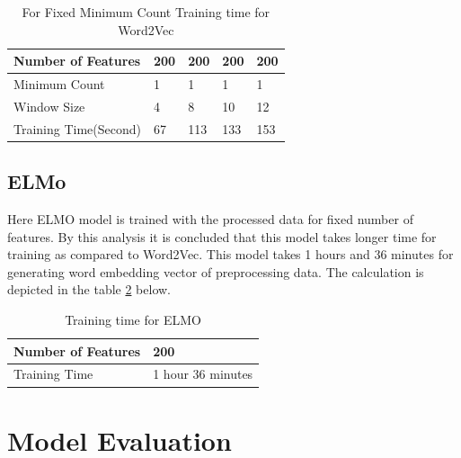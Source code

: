 \begin{center}
\begin{table}[H]
\caption{For Fixed Minimum Count Training time for Word2Vec}
\label{table:Minimum_word_word2vec}
\centering
\begin{tabular}{ |p{4cm}|p{2cm}|p{2cm}|p{2cm}|p{2cm}|  }
 \hline
 Number of Features & 200 &200 &200 &200  \\
 \hline
 Minimum Count   & 1 &1 &1 &1    \\
 \hline
 Window Size &4 &8 &10 &12 \\
 \hline
 Training Time(Second) &67 &113 &133 &153 \\
 \hline
\end{tabular}
\end{table}
\end{center}
\subsection{ELMo}
Here ELMO model is trained with the processed data for fixed number of features. By this analysis it is concluded that this model takes longer time for training as compared to Word2Vec. This model takes 1 hours and 36 minutes for generating word embedding vector of preprocessing data. The calculation is depicted in the table \ref{table:training_time_for_ELMO} below.
\begin{center}
\begin{table}[H]
\caption{Training time for ELMO}
\label{table:training_time_for_ELMO}
\centering
\begin{tabular}{ |p{4cm}|p{6cm}|  }
 \hline
 Number of Features & 200 \\
 \hline
 Training Time  & 1 hour 36 minutes    \\
 \hline
\end{tabular}
\end{table}
\end{center}
\section{Model Evaluation}
